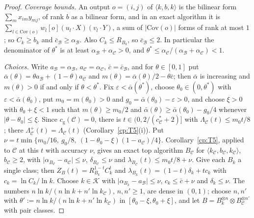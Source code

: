 \documentclass[11pt]{article}
\theoremstyle{definition}
\theoremstyle{remark}
\providecommand{\eps}{\varepsilon}
\newcommand{\abs}[1]{\lvert #1\rvert}
\newcommand{\mat}[3]{\langle #1,#2,#3\rangle} %
\newcommand{\Cov}{\mathrm{Cov}}               %
\newcommand{\ZB}{Z_B}                         %
\newcommand{\Lam}{\Lambda}                    %
\newcommand{\Lamp}{\Lambda^{+}}               %
\newcommand{\cg}{c_{\mathrm g}}               %
\newcommand{\cstar}{c^{*}}                    %
\newcommand{\cbar}{\bar c}                    %
\begin{document}
\begin{proof}
\emph{Coverage bounds.} An output $o=(i,j)$ of $\mat kbk$ is the bilinear form $\sum_mx_{im}y_{mj}$, of rank $b$ as a bilinear form, and in an exact algorithm it is $\sum_{l\in\Cov(o)}w_l[o](u_l\cdot X)(v_l\cdot Y)$, a sum of $\abs{\Cov(o)}$ forms of rank at most $1$; so $C_k\ge b_k$ and $\cbar_{\mathcal B}\ge\alpha_{\mathcal B}$. Also $C_k\le R_{B_k}$, so $\cbar_{\mathcal B}\le2$. In particular the denominator of $\theta^*$ is at least $\alpha_{\mathcal B}+\alpha_{\mathcal C}>0$, and $\theta^*\le\alpha_{\mathcal C}/(\alpha_{\mathcal B}+\alpha_{\mathcal C})<1$.

\emph{Choices.} Write $a_{\mathcal B}=\alpha_{\mathcal B}$, $a_{\mathcal C}=\alpha_{\mathcal C}$, $\bar c=\cbar_{\mathcal B}$, and for $\theta\in[0,1]$ put $\bar\alpha(\theta)=\theta a_{\mathcal B}+(1-\theta)a_{\mathcal C}$ and $m(\theta)=\bar\alpha(\theta)/2-\theta\bar c$; then $\bar\alpha$ is increasing and $m(\theta)>0$ if and only if $\theta<\theta^*$. Fix $\eps<\bar\alpha(\theta^*)$, choose $\theta_0\in(0,\theta^*)$ with $\eps<\bar\alpha(\theta_0)$, put $m_0=m(\theta_0)>0$ and $g_0=\bar\alpha(\theta_0)-\eps>0$, and choose $\xi>0$ with $\theta_0+\xi<1$ such that $m(\theta)\ge m_0/2$ and $\bar\alpha(\theta)\ge\bar\alpha(\theta_0)-g_0/4$ whenever $\abs{\theta-\theta_0}\le\xi$.
Since $\cg(\mathcal C)=0$, there is $t\in(0,2/(\cstar_{\mathcal C}+2)]$ with $\Lam_{\mathcal C}(t)\le m_0t/8$; there $\Lamp_{\mathcal C}(t)=\Lam_{\mathcal C}(t)$ (Corollary~\ref{cp:T5}(i)). Put $\nu=t\min\{m_0/16,\ g_0/8,\ (1-\theta_0-\xi)(1-a_{\mathcal C})/4\}$.
Corollary~\ref{cp:T5}, applied to $\mathcal C$ at this $t$ with accuracy $\nu$, gives an exact top algorithm $B_{\mathcal C}$ for $\mat{k_{\mathcal C}}{b_{\mathcal C}}{k_{\mathcal C}}$, $b_{\mathcal C}\ge2$, with $\abs{\alpha_{B_{\mathcal C}}-a_{\mathcal C}}\le\nu$, $\delta_{B_{\mathcal C}}\le\nu$ and $\lambda_{B_{\mathcal C}}(t)\le m_0t/8+\nu$. Give each $B_k$ a single class; then $\ZB(t)=R_{B_k}^{1-t}C_k^t$ and $\lambda_{B_k}(t)=(1-t)\delta_k+tc_k$ with $c_k=\ln C_k/\ln k$. Choose $k\in\mathcal K$ with $\abs{\alpha_{B_k}-a_{\mathcal B}}\le\nu$, $c_k\le\bar c+\nu$ and $\delta_k\le\nu$. The numbers $n\ln k/(n\ln k+n'\ln k_{\mathcal C})$, $n,n'\ge1$, are dense in $(0,1)$; choose $n,n'$ with $\theta':=n\ln k/(n\ln k+n'\ln k_{\mathcal C})$ in $[\theta_0-\xi,\theta_0+\xi]$, and let $B=B_k^{\otimes n}\otimes B_{\mathcal C}^{\otimes n'}$ with pair classes.


\end{proof}
\end{document}
